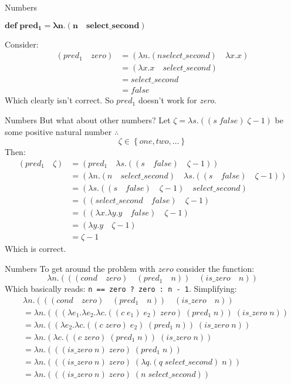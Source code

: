 \documentclass{beamer}
\begin{document}
\begin{frame}{Numbers}
\begin{framed} $\mathbf{def \; pred_1 = \lambda n . (n \quad select\_second)}$ \end{framed}
Consider:
\begin{align*}
	(pred_1 \quad zero) &= (\lambda n . (n select\_second) \quad \lambda x . x) \\
    &= (\lambda x . x \quad select\_second) \\
    &= select\_second \\
    &= false
\end{align*}
Which clearly isn't correct. So $pred_1$ doesn't work for \textit{zero}.
\end{frame}

\begin{frame}{Numbers}
But what about other numbers? Let $\zeta = \lambda s . ((s \; false) \; \zeta-1)$ be some positive natural number $\therefore$ $$\zeta \in \left \{ one, two, \dots \right \}$$ Then:
\begin{align*}
	(pred_1 \quad \zeta) &= (pred_1 \quad \lambda s . ((s \quad false) \quad \zeta - 1)) \\
    &= (\lambda n . (n \quad select\_second) \quad \lambda s. ((s \quad false) \quad \zeta - 1)) \\
    &= (\lambda s . ((s \quad false) \quad \zeta - 1) \quad select\_second) \\
    &= ((select\_second \quad false) \quad \zeta - 1) \\
    &= ((\lambda x . \lambda y . y \quad false) \quad \zeta - 1) \\
    &= (\lambda y . y \quad \zeta - 1) \\
    &= \zeta - 1
\end{align*}
Which is correct.
\end{frame}

\begin{frame}{Numbers}
To get around the problem with $zero$ consider the function: $$\lambda n . (((cond \quad zero) \quad (pred_1 \quad n)) \quad (is\_zero \quad n))$$
Which basically reads: \texttt{n == zero ? zero : n - 1}. Simplifying:
\begin{align*}
	&\lambda n . (((cond \quad zero) \quad (pred_1 \quad n)) \quad (is\_zero \quad n)) \\
    &= \lambda n . (((\lambda e_1 . \lambda e_2 . \lambda c . ((c \; e_1) \; e_2) \; zero) \; (pred_1 \; n)) \; (is\_zero \; n)) \\
    &= \lambda n . ((\lambda e_2. \lambda c. ((c \; zero) \; e_2) \; (pred_1 \; n)) \; (is\_zero \; n)) \\
    &= \lambda n . (\lambda c . ((c \; zero) \; (pred_1 \; n)) \; (is\_zero \; n)) \\
    &= \lambda n . (((is\_zero \; n) \; zero) \; (pred_1 \; n)) \\
    &= \lambda n . (((is\_zero \; n) \; zero) \; (\lambda q.(q \; select\_second) \; n)) \\
    &= \lambda n . (((is\_zero \; n) \; zero) \; (n \; select\_second))
\end{align*}
\end{frame}
\end{document}
